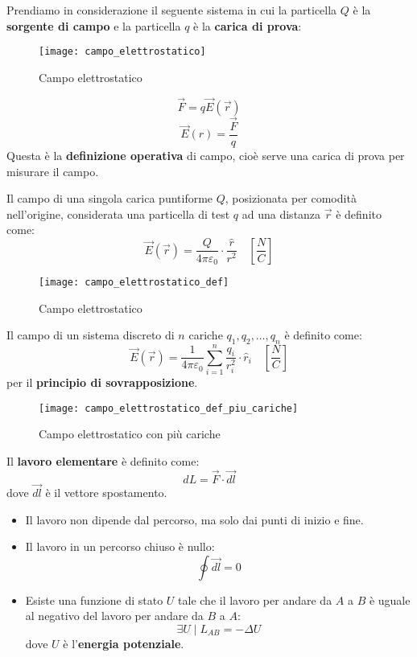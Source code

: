 \documentclass[a4paper]{article}
\begin{document}
\vspace{1em}
\noindent
Prendiamo in considerazione il seguente sistema in cui la particella \( Q \) è la
\textbf{sorgente di campo} e la particella \( q \) è la \textbf{carica di prova}:
\begin{figure}[H]
  \centering
  \texttt{[image: campo\_elettrostatico]}
  \caption{Campo elettrostatico}
\end{figure}
\[
    \vec{F} = q \vec{E} \left( \vec{r} \right)
\] 
\[
  \vec{E} \left( r \right) = \frac{\vec{F}}{q}
\] 
Questa è la \textbf{definizione operativa} di campo, cioè serve una carica di prova per
misurare il campo.

\begin{definition}
  Il campo di una singola carica puntiforme \( Q \), posizionata per comodità nell'origine,
  considerata una particella di test \( q \) ad una distanza \( \vec{r} \) è definito come:
  \[
    \vec{E}( \vec{r} ) = \frac{Q}{4 \pi \varepsilon_0} \cdot \frac{\hat{r}}{r^2}
    \quad \left[ \frac{N}{C} \right]
  \] 
  \begin{figure}[H]
    \centering
    \texttt{[image: campo\_elettrostatico\_def]}
    \caption{Campo elettrostatico}
  \end{figure}
\end{definition}
\begin{definition}
  Il campo di un sistema discreto di \( n \) cariche \( q_1, q_2, \ldots, q_n \) è definito
  come:
  \[
    \vec{E} \left( \vec{r} \right) = \frac{1}{4 \pi \varepsilon_0} \sum_{i=1}^{n}
    \frac{q_i}{r_i^2} \cdot \hat{r}_i \quad \left[ \frac{N}{C} \right]
  \] 
  per il \textbf{principio di sovrapposizione}.
  \begin{figure}[H]
    \centering
    \texttt{[image: campo\_elettrostatico\_def\_piu\_cariche]}
    \caption{Campo elettrostatico con più cariche}
  \end{figure}
\end{definition}

\vspace{1em}
\noindent
\begin{define}
  Il \textbf{lavoro elementare} è definito come:
  \[
    dL = \vec{F} \cdot \vec{dl}
  \] 
  dove \( \vec{dl} \) è il vettore spostamento.
  \begin{itemize}
    \item Il lavoro non dipende dal percorso, ma solo dai punti di inizio e fine.
    \item Il lavoro in un percorso chiuso è nullo:
      \[
        \oint \vec{dl} = 0
      \] 
    \item Esiste una funzione di stato \( U \) tale che il lavoro per andare da \( A \) 
      a \( B \) è uguale al negativo del lavoro per andare da \( B \) a \( A \):
      \[
        \exists U \;|\; L_{AB} = - \Delta U
      \] 
      dove \( U \) è l'\textbf{energia potenziale}.
  \end{itemize}
\end{define}
\end{document}
